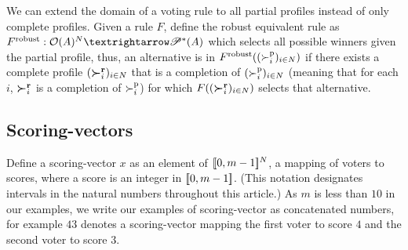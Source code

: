 \documentclass[version=last, pagesize, twoside=off, bibliography=totoc, DIV=calc, fontsize=14pt, a4paper, french, english]{scrartcl}
\begin{document}
We can extend the domain of a voting rule to all partial profiles instead of only complete profiles. Given a rule $F$, define the robust equivalent rule as $F^\text{robust}: \allpprofs → \powersetz{\allalts}$ which selects all possible winners given the partial profile, thus, an alternative is in $F^\text{robust}((\succ_i^\text{p})_{i \in N})$ if there exists a complete profile $(\boldsymbol{\succ}^\textbf{r}_i)_{i \in N}$ that is a completion of $(\succ_i^\text{p})_{i \in N}$ (meaning that for each $i$, $\boldsymbol{\succ}^\textbf{r}_i$ is a completion of $\succ^\text{p}_i$) for which $F((\boldsymbol{\succ}^\textbf{r}_i)_{i \in N})$ selects that alternative.

\subsection{Scoring-vectors}
Define a scoring-vector $x$ as an element of $\lbrack\!\lbrack{}0, m-1\rbrack\!\rbrack^N$, a mapping of voters to scores, where a score is an integer in $\lbrack\!\lbrack{}0, m-1\rbrack\!\rbrack$. (This notation designates intervals in the natural numbers throughout this article.) As $m$ is less than $10$ in our examples, we write our examples of scoring-vector as concatenated numbers, for example $43$ denotes a scoring-vector mapping the first voter to score $4$ and the second voter to score $3$.
\end{document}
